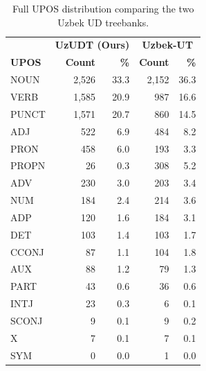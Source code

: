 \documentclass[10pt, a4paper]{article}
\begin{document}
\begin{table}[htbp]
\centering
\small
\begin{tabular}{lrr|rr}
\toprule
& \multicolumn{2}{c|}{\textbf{UzUDT (Ours)}} & \multicolumn{2}{c}{\textbf{Uzbek-UT}} \\
\textbf{UPOS} & \textbf{Count} & \textbf{\%} & \textbf{Count} & \textbf{\%} \\
\midrule
NOUN & 2,526 & 33.3 & 2,152 & 36.3 \\
VERB & 1,585 & 20.9 & 987 & 16.6 \\
PUNCT & 1,571 & 20.7 & 860 & 14.5 \\
ADJ & 522 & 6.9 & 484 & 8.2 \\
PRON & 458 & 6.0 & 193 & 3.3 \\
PROPN & 26 & 0.3 & 308 & 5.2 \\
ADV & 230 & 3.0 & 203 & 3.4 \\
NUM & 184 & 2.4 & 214 & 3.6 \\
ADP & 120 & 1.6 & 184 & 3.1 \\
DET & 103 & 1.4 & 103 & 1.7 \\
CCONJ & 87 & 1.1 & 104 & 1.8 \\
AUX & 88 & 1.2 & 79 & 1.3 \\
PART & 43 & 0.6 & 36 & 0.6 \\
INTJ & 23 & 0.3 & 6 & 0.1 \\
SCONJ & 9 & 0.1 & 9 & 0.2 \\
X & 7 & 0.1 & 7 & 0.1 \\
SYM & 0 & 0.0 & 1 & 0.0 \\
\bottomrule
\end{tabular}
\caption{Full UPOS distribution comparing the two Uzbek UD treebanks.}
\label{tab:appendix_upos}
\end{table}
\end{document}
